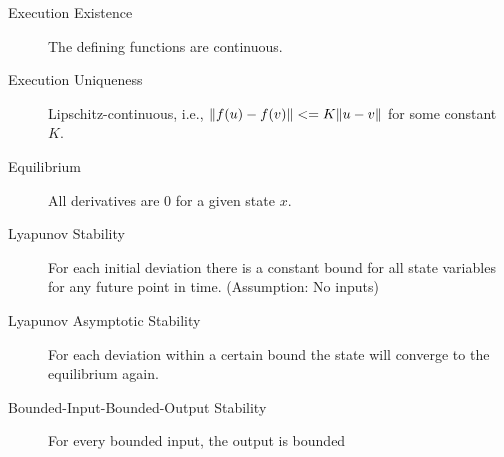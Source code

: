 

\begin{description}
	\item[Execution Existence] The defining functions are continuous.
	\item[Execution Uniqueness] Lipschitz-continuous, i.e., $\Vert f(u) - f(v) \Vert <= K \Vert u - v \Vert$ for some constant $K$.
	\item[Equilibrium] All derivatives are 0 for a given state $x$.
	\item[Lyapunov Stability] For each initial deviation there is a constant bound for all state variables for any future point in time. (Assumption: No inputs)
	\item[Lyapunov Asymptotic Stability] For each deviation within a certain bound the state will converge to the equilibrium again.
	\item[Bounded-Input-Bounded-Output Stability] For every bounded input, the output is bounded
\end{description}

